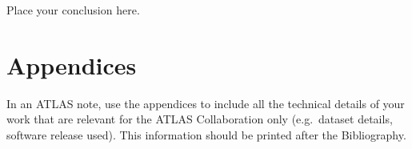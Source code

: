 \documentclass[NOTE, atlasdraft=true, texlive=2016, UKenglish]{\ATLASLATEXPATH atlasdoc}
\begin{document}
\maketitle

\tableofcontents


\clearpage
%
\clearpage

\clearpage

\clearpage

\clearpage

\clearpage

\clearpage
%

\clearpage

\clearpage

\clearpage

\clearpage

Place your conclusion here.


\printbibliography
%
%

\clearpage


\clearpage
\appendix
\part*{Appendices}

In an ATLAS note, use the appendices to include all the technical details of your work
that are relevant for the ATLAS Collaboration only (e.g.\ dataset details, software release used).
This information should be printed after the Bibliography.
\end{document}
